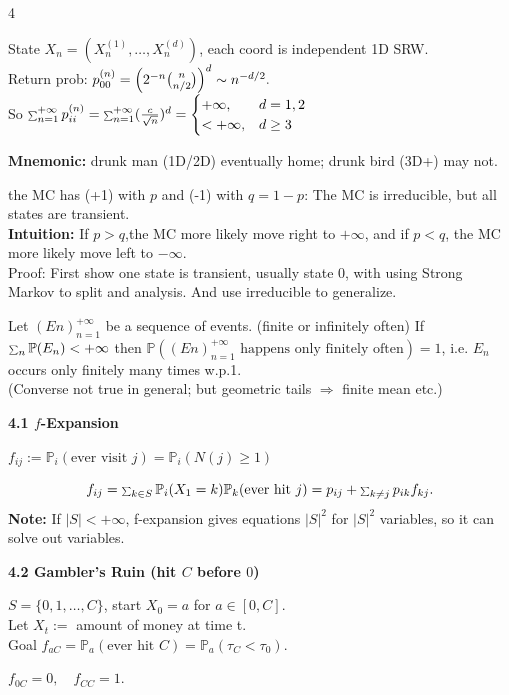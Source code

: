 \documentclass[a4paper, landscape]{article}
\newcommand{\topic}[1]{\par\medskip\textbf{#1}\par}
\newcommand{\subtopic}[1]{\par\textbf{#1}}
\newcommand{\smallsum}{\mathop{\scalebox{0.65}{$\sum$}}\nolimits}
\renewcommand{\topic}[1]{\par\medskip\noindent\colorbox{highlightcolor}{\parbox{\dimexpr\columnwidth-2\fboxsep\relax}{\textbf{#1}}}\par}
\renewcommand{\subtopic}[1]{\par\textbf{\color{blue}{#1}}} %
\begin{document}
\begin{multicols}{4}
\subtopic{$d$-D SRW on $\mathbb Z^d$:}
State $X_n=(X_n^{(1)},\dots,X_n^{(d)})$, each coord is independent 1D SRW.\\
Return prob:
$p^{(n)}_{00}=\Bigl(2^{-n}{n\choose n/2}\Bigr)^d \sim n^{-d/2}.$\\
So
$\smallsum_{n=1}^{+\infty}p^{(n)}_{ii}
=
\smallsum_{n=1}^{+\infty}(\frac{c}{\sqrt n})^d=
\begin{cases}
+\infty,& d=1,2\ \\
<+\infty,& d\ge3\
\end{cases}$

\textbf{Mnemonic:} drunk man (1D/2D) eventually home; drunk bird (3D+) may not.

\subtopic{biased SRW on $\mathbb Z$:} the MC has (+1) with $p$ and (-1) with $q=1-p$: The MC is irreducible, but all states are transient.\\
\textbf{Intuition:} If $p>q$,the MC more likely move right to $+\infty$, and if $p<q$, the MC more likely move left to $-\infty$.\\
Proof: First show one state is transient, usually state 0, with using Strong Markov to split and analysis. And use irreducible to generalize.


\subtopic{Borel--Cantelli lemma:}
Let $(En)_{n=1}^{+\infty}$ be a sequence of events. (finite or infinitely often) If $\smallsum_n \mathbb P(E_n)<+\infty$ then $\mathbb P((En)_{n=1}^{+\infty} \text{ happens only finitely often})=1$, i.e. $E_n$ occurs only finitely many times w.p.1.\\
(Converse not true in general; but geometric tails $\Rightarrow$ finite mean etc.)


\topic{4.1 $f$-Expansion}
\subtopic{Hitting prob:}
$f_{ij}:=\mathbb P_i(\text{ever visit }j)=\mathbb P_i(N(j)\ge1)$

\subtopic{$f$-Expansion}
\[
f_{ij}=\smallsum_{k\in S}\mathbb P_i(X_1=k)\mathbb P_k(\text{ever hit }j)
=p_{ij}+\smallsum_{k\neq j}p_{ik}f_{kj}.
\]
\textbf{Note:} If $|S|<+\infty$, f-expansion gives equations $|S|^2$ for $|S|^2$ variables, so it can solve out variables.


\topic{4.2 Gambler's Ruin (hit $C$ before $0$)}
\subtopic{Model:}
$S=\{0,1,\dots,C\}$, start $X_0=a$ for $a\in [0,C]$.\\
Let $X_t:=$ amount of money at time t.\\
Goal $f_{aC}=\mathbb P_a(\text{ever hit }C)=\mathbb P_a(\tau_C<\tau_0)$.

\subtopic{Boundary:}
$f_{0C}=0,\quad f_{CC}=1$.


\end{multicols}
\end{document}
